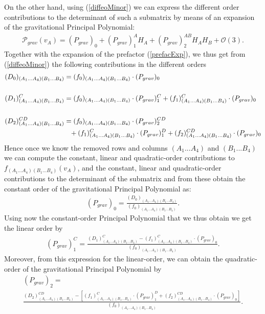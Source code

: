 On the other hand, using (\ref{diffeoMinor}) we can express the different order contributions to the determinant of such a submatrix by means of an expansion of the gravitational Principal Polynomial:
\begin{align}
    \mathcal{P}_{grav}(v_A) = (P_{grav})_{0} + (P_{grav})^A_1 H_A+ (P_{grav})^{AB}_2 H_A H_B +\mathcal{O}(3).
\end{align}
Together with the expansion of the prefactor (\ref{prefacExp}), we thus get from (\ref{diffeoMinor}) the following contributions in the different orders
\begin{align}\label{minorPoly}
    \begin{aligned}
    (D_0)_{(A_1...A_4)(B_1...B_4)}  &= (f_0)_{(A_1...A_4)(B_1...B_4)} \cdot (P_{grav})_0 \\
    \\
    (D_1)^C_{(A_1...A_4)(B_1...B_4)}  &= (f_0)_{(A_1...A_4)(B_1...B_4)} \cdot (P_{grav})^C_1 + (f_1)^C_{(A_1...A_4)(B_1...B_4)} \cdot (P_{grav})_0  \\
    \\
    (D_2)^{CD}_{(A_1...A_4)(B_1...B_4)}  &=  (f_0)_{(A_1...A_4)(B_1...B_4)} \cdot (P_{grav})_2^{CD} \\
     & \hphantom{=} +
     (f_1)^C_{(A_1...A_4)(B_1...B_4)} \cdot (P_{grav})_1^D +(f_2)^{CD}_{(A_1...A_4)(B_1...B_4)} \cdot (P_{grav})_0 
    \end{aligned}
\end{align}
Hence once we know the removed rows and columns $(A_1...A_4)$ and $(B_1...B_4)$ we can compute the constant, linear and quadratic-order contributions to $f_{(A_1...A_4)(B_1...B_4)}(v_A)$, and the constant, linear and quadratic-order contributions to the determinant of the submatrix and from these obtain the constant order of the gravitational Principal Polynomial as:
\begin{align}\label{POLY1}
(P_{grav})_0 = \frac{(D_0)_{(A_1...A_4)(B_1...B_4)}}{(f_0)_{(A_1...A_4)(B_1...B_4)}}.
\end{align}
Using now the constant-order Principal Polynomial that we thus obtain we get the linear order by
\begin{align}\label{POLY2}
    (P_{grav})^C_1= \frac{(D_1)^C_{(A_1...A_4)(B_1...B_4)} - (f_1)^C_{(A_1...A_4)(B_1...B_4)} \cdot (P_{grav})_0}{(f_0)_{(A_1...A_4)(B_1...B_4)}}.
\end{align}
Moreover, from this expression for the linear-order, we can obtain the quadratic-order of the gravitational Principal Polynomial by 
\begin{multline}\label{POLY3}
    (P_{grav})_2 = \\
    \frac{(D_2)^{CD}_{(A_1...A_4)(B_1...B_4)}-\left [ (f_1)^C_{(A_1...A_4)(B_1...B_4)} \cdot (P_{grav})^D_1  +(f_2)^{CD}_{(A_1...A_4)(B_1...B_4)} \cdot (P_{grav})_0 \right ]}{(f_0)_{(A_1...A_4)(B_1...B_4)}}.
\end{multline}
